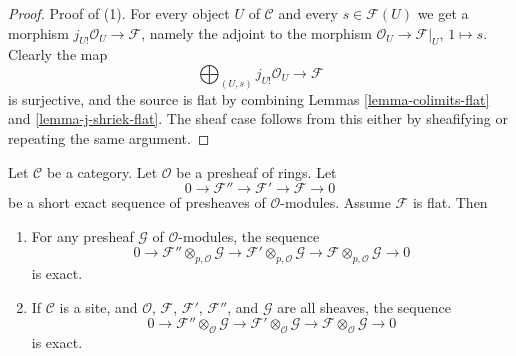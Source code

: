 \begin{proof}
Proof of (1). For every object $U$ of $\mathcal{C}$ and every
$s \in \mathcal{F}(U)$ we get a morphism
$j_{U!}\mathcal{O}_U \to \mathcal{F}$, namely the adjoint to
the morphism $\mathcal{O}_U \to \mathcal{F}|_U$, $1 \mapsto s$.
Clearly the map
$$
\bigoplus\nolimits_{(U, s)} j_{U!}\mathcal{O}_U
\longrightarrow
\mathcal{F}
$$
is surjective, and the source is flat by combining Lemmas
\ref{lemma-colimits-flat} and \ref{lemma-j-shriek-flat}.
The sheaf case follows from this either by
sheafifying or repeating the same argument.
\end{proof}

\begin{lemma}
\label{lemma-flat-tor-zero}
Let $\mathcal{C}$ be a category.
Let $\mathcal{O}$ be a presheaf of rings.
Let
$$
0 \to \mathcal{F}'' \to \mathcal{F}' \to \mathcal{F} \to 0
$$
be a short exact sequence of presheaves of $\mathcal{O}$-modules.
Assume $\mathcal{F}$ is flat. Then
\begin{enumerate}
\item For any presheaf $\mathcal{G}$
of $\mathcal{O}$-modules, the sequence
$$
0 \to
\mathcal{F}'' \otimes_{p, \mathcal{O}} \mathcal{G} \to
\mathcal{F}' \otimes_{p, \mathcal{O}} \mathcal{G} \to
\mathcal{F} \otimes_{p, \mathcal{O}} \mathcal{G} \to 0
$$
is exact.
\item If $\mathcal{C}$ is a site, and $\mathcal{O}$,
$\mathcal{F}$, $\mathcal{F}'$, $\mathcal{F}''$, and
$\mathcal{G}$ are all sheaves, the sequence
$$
0 \to
\mathcal{F}'' \otimes_\mathcal{O} \mathcal{G} \to
\mathcal{F}' \otimes_\mathcal{O} \mathcal{G} \to
\mathcal{F} \otimes_\mathcal{O} \mathcal{G} \to 0
$$
is exact.
\end{enumerate}
\end{lemma}

